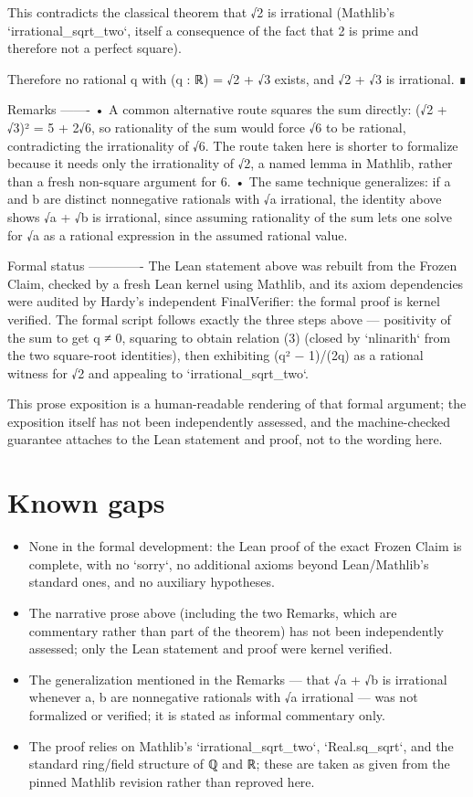 \documentclass[11pt]{article}
\begin{document}
This contradicts the classical theorem that √2 is irrational (Mathlib's `irrational\_sqrt\_two`, itself a consequence of the fact that 2 is prime and therefore not a perfect square).

Therefore no rational q with (q : ℝ) = √2 + √3 exists, and √2 + √3 is irrational. ∎

Remarks
-------
• A common alternative route squares the sum directly: (√2 + √3)² = 5 + 2√6, so rationality of the sum would force √6 to be rational, contradicting the irrationality of √6. The route taken here is shorter to formalize because it needs only the irrationality of √2, a named lemma in Mathlib, rather than a fresh non-square argument for 6.
• The same technique generalizes: if a and b are distinct nonnegative rationals with √a irrational, the identity above shows √a + √b is irrational, since assuming rationality of the sum lets one solve for √a as a rational expression in the assumed rational value.

Formal status
-------------
The Lean statement above was rebuilt from the Frozen Claim, checked by a fresh Lean kernel using Mathlib, and its axiom dependencies were audited by Hardy's independent FinalVerifier: the formal proof is kernel verified. The formal script follows exactly the three steps above — positivity of the sum to get q ≠ 0, squaring to obtain relation (3) (closed by `nlinarith` from the two square-root identities), then exhibiting (q² − 1)/(2q) as a rational witness for √2 and appealing to `irrational\_sqrt\_two`.

This prose exposition is a human-readable rendering of that formal argument; the exposition itself has not been independently assessed, and the machine-checked guarantee attaches to the Lean statement and proof, not to the wording here.

\section*{Known gaps}
\begin{itemize}
\item None in the formal development: the Lean proof of the exact Frozen Claim is complete, with no `sorry`, no additional axioms beyond Lean/Mathlib's standard ones, and no auxiliary hypotheses.
\item The narrative prose above (including the two Remarks, which are commentary rather than part of the theorem) has not been independently assessed; only the Lean statement and proof were kernel verified.
\item The generalization mentioned in the Remarks — that √a + √b is irrational whenever a, b are nonnegative rationals with √a irrational — was not formalized or verified; it is stated as informal commentary only.
\item The proof relies on Mathlib's `irrational\_sqrt\_two`, `Real.sq\_sqrt`, and the standard ring/field structure of ℚ and ℝ; these are taken as given from the pinned Mathlib revision rather than reproved here.
\end{itemize}
\end{document}
